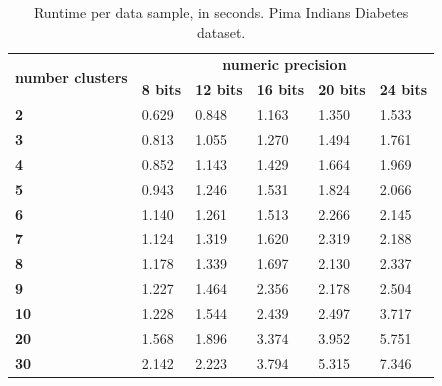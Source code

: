 \begin{table}[H]
\centering
\caption{Runtime per data sample, in seconds. Pima Indians Diabetes dataset.}
\label{table:runtimeKMPID}
\begin{tabular}{|l|l|l|l|l|l|}
\hline
\multirow{2}{*}{\textbf{number clusters}} & \multicolumn{5}{c|}{\textbf{numeric precision}}                                              \\ \cline{2-6}
                                          & \textbf{8 bits} & \textbf{12 bits} & \textbf{16 bits} & \textbf{20 bits} & \textbf{24 bits} \\ \hline
\textbf{2}                                & 0.629           & 0.848            & 1.163            & 1.350            & 1.533            \\ \hline
\textbf{3}                                & 0.813           & 1.055            & 1.270            & 1.494            & 1.761            \\ \hline
\textbf{4}                                & 0.852           & 1.143            & 1.429            & 1.664            & 1.969            \\ \hline
\textbf{5}                                & 0.943           & 1.246            & 1.531            & 1.824            & 2.066            \\ \hline
\textbf{6}                                & 1.140           & 1.261            & 1.513            & 2.266            & 2.145            \\ \hline
\textbf{7}                                & 1.124           & 1.319            & 1.620            & 2.319            & 2.188            \\ \hline
\textbf{8}                                & 1.178           & 1.339            & 1.697            & 2.130            & 2.337            \\ \hline
\textbf{9}                                & 1.227           & 1.464            & 2.356            & 2.178            & 2.504            \\ \hline
\textbf{10}                               & 1.228           & 1.544            & 2.439            & 2.497            & 3.717            \\ \hline
\textbf{20}                               & 1.568           & 1.896            & 3.374            & 3.952            & 5.751            \\ \hline
\textbf{30}                               & 2.142           & 2.223            & 3.794            & 5.315            & 7.346            \\ \hline

\end{tabular}
\end{table}
